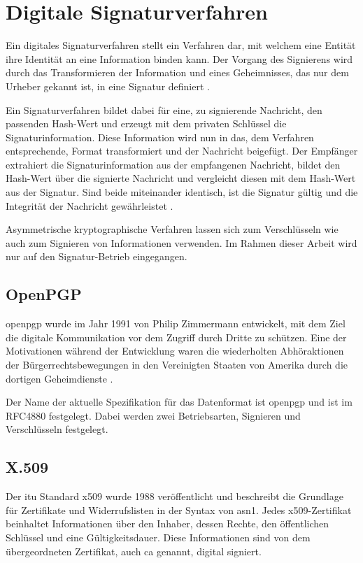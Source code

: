\section{Digitale Signaturverfahren}
\label{sec:GrundlagenDefinitionen:DigitaleSignaturen:Verfahren}
Ein digitales Signaturverfahren stellt ein Verfahren dar, mit welchem eine Entität ihre Identität an eine Information binden kann. Der Vorgang des Signierens
wird durch das Transformieren der Information und eines Geheimnisses, das nur dem Urheber gekannt ist, in eine Signatur definiert \cite{hac}.

Ein Signaturverfahren bildet dabei für eine, zu signierende Nachricht, den passenden Hash-Wert und erzeugt mit dem privaten Schlüssel die Signaturinformation.
Diese Information wird nun in das, dem Verfahren entsprechende, Format transformiert und der Nachricht beigefügt.
Der Empfänger extrahiert die Signaturinformation aus der empfangenen Nachricht, bildet den Hash-Wert über die signierte Nachricht und vergleicht diesen mit dem
Hash-Wert aus der Signatur. Sind beide miteinander identisch, ist die Signatur gültig und die Integrität der Nachricht gewährleistet \cite{hac,singh:messages}.

Asymmetrische kryptographische Verfahren lassen sich zum Verschlüsseln wie auch zum Signieren von Informationen verwenden. Im Rahmen dieser Arbeit wird nur auf
den Signatur-Betrieb eingegangen.

\subsection{OpenPGP}
\label{sec:GrundlagenDefinitionen:DigitaleSignaturen:Verfahren:openpgp}
\gls{openpgp} wurde im Jahr 1991 von Philip Zimmermann \cite{zimmermann:pgp} entwickelt, mit dem Ziel die digitale Kommunikation vor dem Zugriff durch Dritte zu
schützen. Eine der Motivationen während der Entwicklung waren die wiederholten Abhöraktionen der Bürgerrechtsbewegungen in den Vereinigten Staaten von Amerika
durch die dortigen Geheimdienste \cite{singh:messages}.

Der Name der aktuelle Spezifikation für das Datenformat ist \gls{openpgp} und ist im RFC4880 \cite{openpgp:ietf} festgelegt. Dabei werden zwei Betriebsarten,
Signieren und Verschlüsseln festgelegt.


\subsection{X.509}
\label{sec:GrundlagenDefinitionen:DigitaleSignaturen:Verfahren:x509}
Der \gls{itu} Standard \gls{x509} wurde 1988 veröffentlicht und beschreibt die Grundlage für Zertifikate und Widerrufslisten in der Syntax von \gls{asn1}.
Jedes \gls{x509}-Zertifikat beinhaltet Informationen über den Inhaber, dessen Rechte, den öffentlichen Schlüssel und eine Gültigkeitsdauer. Diese Informationen
sind von dem übergeordneten Zertifikat, auch \gls{ca} genannt, digital signiert.

